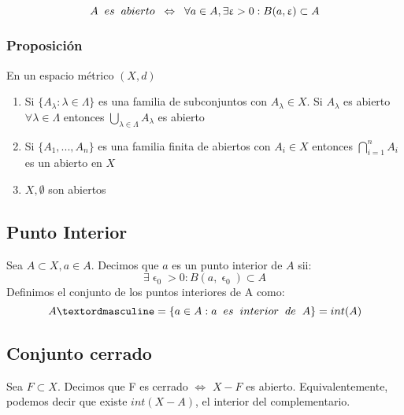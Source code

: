 \documentclass[11pt]{article}
\begin{document}
\[
A \hspace{0.2cm} es \hspace{0.2cm}abierto \hspace{0.2cm}\Leftrightarrow \hspace{0.2cm} \forall a \in A, \exists \upvarepsilon > 0 : B(a,\upvarepsilon)\subset A
\]



\subsubsection*{Proposición}

En un espacio métrico $(X,d)$
\begin{enumerate}
	\item Si $\{ A_\lambda : \lambda \in \Lambda\}$ es una familia de subconjuntos con $A_\lambda \in X$. Si $A_\lambda$ es abierto $\forall \lambda \in \Lambda$ entonces $\bigcup_{\lambda \in \Lambda}A_\lambda$ es abierto
	
	\item Si $\{A_1,...,A_n\}$ es una familia finita de abiertos con $A_i \in X $ entonces $\bigcap_{i=1}^n A_i$ es un abierto en $X$

	\item $X, \emptyset$ son abiertos

\end{enumerate}

\subsection*{Punto Interior}

Sea $A\subset X, a \in A$. Decimos que $a$ es un punto interior de $A$ sii:
\[
\exists \upvarepsilon_0 > 0: B(a,\upvarepsilon_0) \subset A
\]
Definimos el conjunto de los puntos interiores de A como:
\[
Aº = \{ a\in A: a \hspace{0.2cm} es \hspace{0.2cm} interior\hspace{0.2cm}de \hspace{0.2cm}A \} = int(A)
\]



\subsection*{Conjunto cerrado}

Sea $F\subset X$. Decimos que F es cerrado $\Leftrightarrow$ $X-F$ es abierto.
Equivalentemente, podemos decir que existe $int(X-A)$, el interior del complementario.
\end{document}
